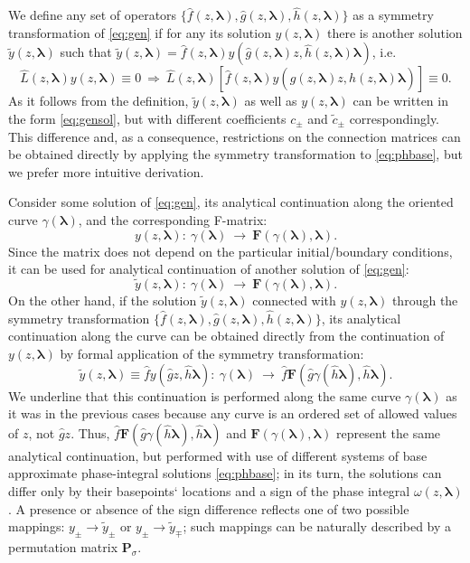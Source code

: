 \documentclass[atmp]{ipart_v1}
\def\LL{\widehat{L}}
\def\lmbd{\bm{\lambda}}
\def\F{\bm{F}}
\def\f{\hat{f}}
\def\g{\hat{g}}
\def\h{\hat{h}}
\def\P{\bm{P}_\sigma}
\def\w{\omega}
\newcommand\eref[1]{\eqref{#1}}
\begin{document}
We define any set of operators $\{\f(z,\lmbd),\g(z,\lmbd),\h(z,\lmbd)\}$ as a symmetry 
transformation of \eref{eq:gen}
if for any its solution $y(z,\lmbd)$ there is another solution $\tilde{y}(z,\lmbd)$ such that
$\tilde{y}(z,\lmbd)=\f(z,\lmbd)y(\g(z,\lmbd)z,\h(z,\lmbd)\lmbd)$, i.e.
\begin{equation}
\LL(z,\lmbd)y(z,\lmbd) \equiv 0 \ \Longrightarrow\  
\LL(z,\lmbd) \left[ \f(z,\lmbd)y(\g(z,\lmbd)z,\h(z,\lmbd)\lmbd) \right] \equiv 0.   \label{eq:symdef}
\end{equation}
As it follows from the definition, 
$\tilde{y}(z,\lmbd)$ as well as $y(z,\lmbd)$ can be written in the form \eref{eq:gensol},
but with different coefficients $c_\pm$ and $\tilde{c}_\pm$ correspondingly. 
This difference and, as a consequence, restrictions on the connection matrices 
can be obtained directly by applying the symmetry transformation to \eref{eq:phbase}, 
but we prefer more intuitive derivation.

Consider some solution of \eref{eq:gen}, its analytical continuation along the 
oriented curve $\gamma(\lmbd)$, and the corresponding F-matrix:
\begin{equation}
y(z,\lmbd):\ \gamma(\lmbd)\ \longrightarrow\ \F(\gamma(\lmbd),\lmbd). 
\end{equation}
Since the matrix does not depend on the particular initial/boundary conditions,
it can be used for analytical continuation of another solution of \eref{eq:gen}:
\begin{equation}
\tilde{y}(z,\lmbd):\ \gamma(\lmbd)\ \longrightarrow\ \F(\gamma(\lmbd),\lmbd). 
\end{equation}
On the other hand, if the solution $\tilde{y}(z,\lmbd)$ connected with $y(z,\lmbd)$ through
the symmetry transformation $\{\f(z,\lmbd),\g(z,\lmbd),\h(z,\lmbd)\}$, its analytical continuation
along the curve can be obtained directly from the continuation of $y(z,\lmbd)$ by formal application
of the symmetry transformation:
\begin{equation}
\tilde{y}(z,\lmbd) \equiv \f y(\g z,\h \lmbd):\ 
\gamma(\lmbd)\ \longrightarrow\ \f\F(\g\gamma(\h\lmbd),\h\lmbd). 
\end{equation}
We underline that this continuation is performed along the same curve $\gamma(\lmbd)$ as it was in 
the previous cases because any curve is an ordered set of allowed values of $z$, not $\g z$. Thus, 
$\f\F(\g\gamma(\h\lmbd),\h\lmbd)$ and $\F(\gamma(\lmbd),\lmbd)$ represent the same analytical continuation, but
performed with use of different systems of base approximate phase-integral solutions \eref{eq:phbase}; 
in its turn, the solutions can differ only by their basepoints` locations and a sign of the phase 
integral $\w(z,\lmbd)$. A presence or absence of the sign difference reflects one of two possible 
mappings: $y_\pm \rightarrow \tilde{y}_\pm$ or $y_\pm \rightarrow \tilde{y}_\mp$;
such mappings can be naturally described by a permutation matrix $\P$.
 
\end{document}
